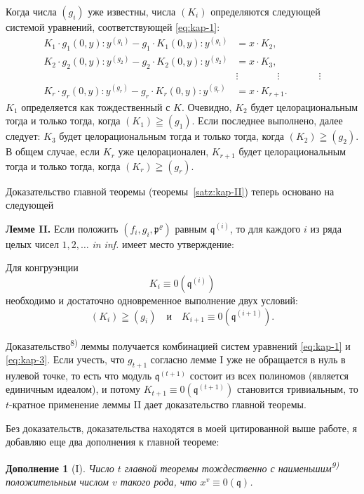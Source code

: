 \documentclass[11pt]{article}
\theoremstyle{plain}
\newtheorem{zusatz}{Дополнение}
\begin{document}
Когда числа $(g_{i})$ уже известны, числа $(K_{i})$ определяются
следующей системой уравнений, соответствующей \eqref{eq:kap-1}:
\begin{equation}\label{eq:kap-3}
\begin{aligned}
K_{1}\cdot g_{1}(0,y):y^{(g_{1})} - g_{1}\cdot K_{1}(0,y):y^{(g_{1})} &= x\cdot K_{2},\\
K_{2}\cdot g_{2}(0,y):y^{(g_{2})} - g_{2}\cdot K_{2}(0,y):y^{(g_{2})} &= x\cdot K_{3},\\
&\vdots \qquad\qquad\vdots\qquad\qquad\vdots\\
K_{r}\cdot g_{r}(0,y):y^{(g_{r})} - g_{r}\cdot K_{r}(0,y):y^{(g_{r})} &= x\cdot K_{r+1}.
\end{aligned}
\end{equation}
$K_{1}$ определяется как тождественный с $K$. Очевидно, $K_{2}$ будет
целорациональным тогда и только тогда, когда $(K_1)\geqq(g_1)$.
Если последнее выполнено, далее следует: $K_{3}$ будет
целорациональным тогда и только тогда, когда $(K_2)\geqq(g_2)$.
В общем случае, если $K_{r}$ уже целорационален, $K_{r+1}$ будет
целорациональным тогда и только тогда, когда $(K_r)\geqq(g_r)$.

Доказательство главной теоремы (теоремы~\ref{satz:kap-II}) теперь
основано на следующей

\smallskip
\textbf{Лемме II.} Если положить
$(f_i,g_i,\mathfrak{p}^\varrho)$ равным $\mathfrak{q}^{(i)}$, то для
каждого $i$ из ряда целых чисел $1, 2, \ldots$ \textit{in inf.}
имеет место утверждение:

Для конгруэнции
\[
K_{i} \equiv 0(\mathfrak{q}^{(i)})
\]
необходимо и достаточно одновременное выполнение двух условий:
\[
(K_i)\geqq(g_i)\quad \text{и}\quad K_{i+1}\equiv0(\mathfrak{q}^{(i+1)}).
\]

Доказательство\textsuperscript{8)} леммы получается комбинацией
систем уравнений \eqref{eq:kap-1} и \eqref{eq:kap-3}. Если учесть,
что $g_{t+1}$ согласно лемме I уже не обращается в нуль в нулевой
точке, то есть что модуль $\mathfrak{q}^{(t+1)}$ состоит из всех
полиномов (является единичным идеалом), и потому
$K_{t+1} \equiv 0(\mathfrak{q}^{(t+1)})$ становится тривиальным, то
$t$-кратное применение леммы II дает доказательство главной
теоремы.

\smallskip
Без доказательств, доказательства находятся в моей цитированной
выше работе, я добавляю еще два дополнения к главной теореме:

\begin{zusatz}[I]
Число $t$ главной теоремы тождественно с наименьшим\textsuperscript{9)}
положительным числом $v$ такого рода, что
$x^{v} \equiv 0(\mathfrak{q})$.
\end{zusatz}
\end{document}
